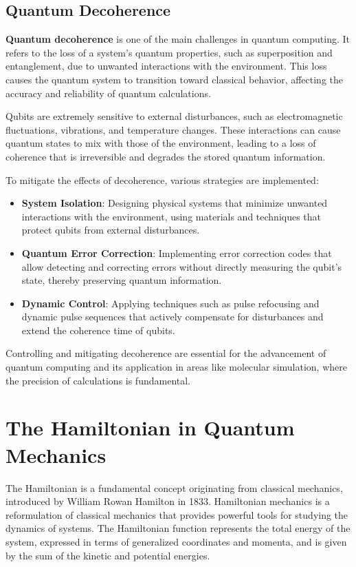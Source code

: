 \subsection{Quantum Decoherence}

\textbf{Quantum decoherence} is one of the main challenges in quantum computing. It refers to the loss of a system's quantum properties, such as superposition and entanglement, due to unwanted interactions with the environment. This loss causes the quantum system to transition toward classical behavior, affecting the accuracy and reliability of quantum calculations.

Qubits are extremely sensitive to external disturbances, such as electromagnetic fluctuations, vibrations, and temperature changes. These interactions can cause quantum states to mix with those of the environment, leading to a loss of coherence that is irreversible and degrades the stored quantum information.

To mitigate the effects of decoherence, various strategies are implemented:

\begin{itemize}
    \item \textbf{System Isolation}: Designing physical systems that minimize unwanted interactions with the environment, using materials and techniques that protect qubits from external disturbances.
    \item \textbf{Quantum Error Correction}: Implementing error correction codes that allow detecting and correcting errors without directly measuring the qubit's state, thereby preserving quantum information.
    \item \textbf{Dynamic Control}: Applying techniques such as pulse refocusing and dynamic pulse sequences that actively compensate for disturbances and extend the coherence time of qubits.
\end{itemize}

Controlling and mitigating decoherence are essential for the advancement of quantum computing and its application in areas like molecular simulation, where the precision of calculations is fundamental.

\section{The Hamiltonian in Quantum Mechanics}

The Hamiltonian is a fundamental concept originating from classical mechanics, introduced by William Rowan Hamilton in 1833. Hamiltonian mechanics is a reformulation of classical mechanics that provides powerful tools for studying the dynamics of systems. The Hamiltonian function represents the total energy of the system, expressed in terms of generalized coordinates and momenta, and is given by the sum of the kinetic and potential energies.

